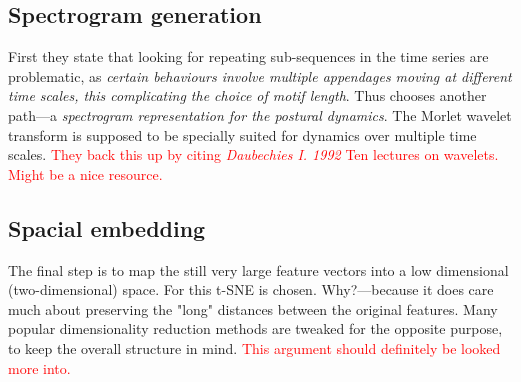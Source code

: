 \documentclass{article}
\theoremstyle{plain}
\theoremstyle{definition}
\theoremstyle{remark}
\begin{document}
\subsection{Spectrogram generation}
First they state that looking for repeating sub-sequences in the time series are problematic, as \textit{certain behaviours involve multiple appendages moving at different time scales, this complicating the choice of motif length}.
Thus \cite{berman} chooses another path—a \textit{spectrogram representation for the postural dynamics}.
The Morlet wavelet transform is supposed to be specially suited for dynamics over multiple time scales.
\textcolor{red}{They back this up by citing \textit{Daubechies I. 1992} Ten lectures on wavelets.
Might be a nice resource.}

\subsection{Spacial embedding}
The final step is to map the still very large feature vectors into a low dimensional (two-dimensional) space.
For this t-SNE is chosen.
Why?—because it does care much about preserving the "long" distances between the original features.
Many popular dimensionality reduction methods are tweaked for the opposite purpose, to keep the overall structure in mind.
\textcolor{red}{This argument should definitely be looked more into.}
\end{document}
